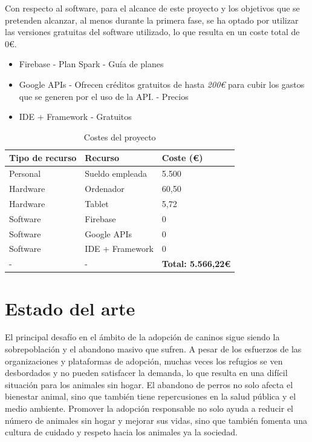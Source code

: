 \documentclass[a4paper, 12pt]{article}
\begin{document}
Con respecto al software, para el alcance de este proyecto y los objetivos que se pretenden alcanzar, al menos durante la primera fase, se ha optado por utilizar las versiones gratuitas del software utilizado, lo que resulta en un coste total de 0€.

\begin{itemize}[noitemsep]
	\item Firebase - Plan Spark - Guía de planes \cite{firebase_plans}
	\item Google APIs - Ofrecen créditos gratuitos de hasta \textit{200€} para cubir los gastos que se generen por el uso de la API. - Precios \cite{google_prices}
	\item IDE + Framework - Gratuitos
\end{itemize}


\begin{table}[H]
    \centering
    \begin{tabular}{ | m{5cm} | m{5cm} | m{5cm} | }
	    \hline \textbf{Tipo de recurso} & \textbf{Recurso} & \textbf{Coste (€)} \\ \hline
	    	Personal & Sueldo empleada & 5.500 \\ \hline
		Hardware & Ordenador & 60,50 \\ \hline
		Hardware & Tablet & 5,72 \\ \hline
	    	Software & Firebase & 0 \\ \hline
		Software & Google APIs & 0 \\ \hline
		Software & IDE + Framework & 0 \\ \hline
	   	- & -  & \textbf{Total: 5.566,22€} \\ \hline
    \end{tabular}
    \caption{Costes del proyecto}
    \label{tab:costes}
\end{table}

\newpage
\section{Estado del arte}

El principal desafío en el ámbito de la adopción de caninos sigue siendo la sobrepoblación y el abandono masivo que sufren. A pesar de los esfuerzos de las organizaciones y plataformas de adopción, muchas veces los refugios se ven desbordados y no pueden satisfacer la demanda, lo que resulta en una difícil situación para los animales sin hogar. El abandono de perros no solo afecta el bienestar animal, sino que también tiene repercusiones en la salud pública y el medio ambiente. Promover la adopción responsable no solo ayuda a reducir el número de animales sin hogar y mejorar sus vidas, sino que también fomenta una cultura de cuidado y respeto hacia los animales ya la sociedad.
\end{document}
